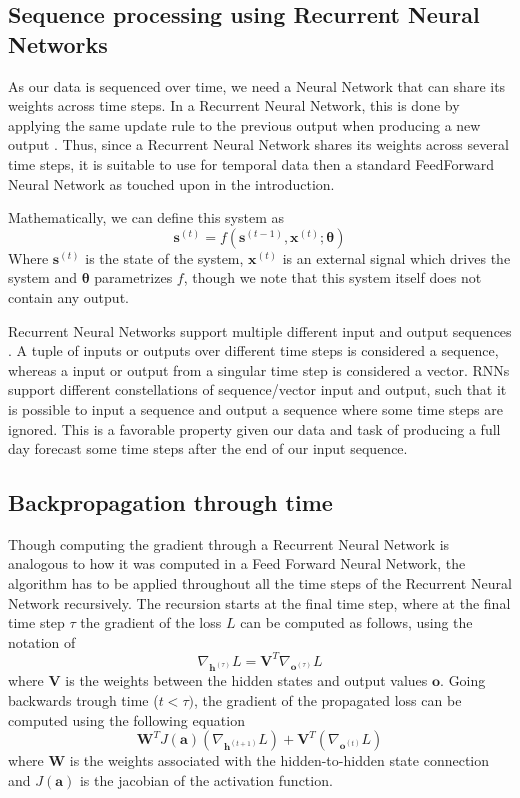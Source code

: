 \documentclass
[twocolumn,
secnumarabic,
nobibnotes,
aps,
prl,
reprint,
groupedaddress,
amsmath,
amssymb,
]{revtex4-2}
\begin{document}
\subsection{Sequence processing using Recurrent Neural Networks}
As our data is sequenced over time, we need a Neural Network that can share its weights across time steps. In a Recurrent Neural Network, this is done by applying the same update rule to the previous output when producing a new output \cite{Goodfellow2016}. Thus, since a Recurrent Neural Network shares its weights across several time steps, it is suitable to use for temporal data then a standard FeedForward Neural Network as touched upon in the introduction.

Mathematically, we can define this system as
\begin{equation}
  \nonumber
  \bm{s}^{(t)} = f(\bm{s}^{(t-1)},\bm{x}^{(t)};\bm{\theta})
\end{equation}
Where $\bm{s}^{(t)}$ is the state of the system, $\bm{x}^{(t)}$ is an external signal which drives the system and $\bm{\theta}$ parametrizes $f$, though we note that this system itself does not contain any output. 

Recurrent Neural Networks support multiple different input and output sequences \cite{Geron2019}. A tuple of inputs or outputs over different time steps is considered a sequence, whereas a input or output from a singular time step is considered a vector. RNNs support different constellations of sequence/vector input and output, such that it is possible to input a sequence and output a sequence where some time steps are ignored. This is a favorable property given our data and task of producing a full day forecast some time steps after the end of our input sequence.

\subsection{Backpropagation through time}
Though computing the gradient through a Recurrent Neural Network is analogous to how it was computed in a Feed Forward Neural Network, the algorithm has to be applied throughout all the time steps of the Recurrent Neural Network recursively. The recursion starts at the final time step, where at the final time step $\tau$ the gradient of the loss $L$ can be computed as follows, using the notation of \cite{Goodfellow2016}
\begin{equation}
  \nabla_{\bm{h}^{(\tau)}}L = \bm{V}^T \nabla_{\bm{o}^{(\tau)}}L
\end{equation}
where $\bm{V}$ is the weights between the hidden states and output values $\bm{o}$.
Going backwards trough time ($t < \tau)$, the gradient of the propagated loss can be computed using the following equation
\begin{equation}
  \bm{W}^TJ(\bm{a})(\nabla_{\bm{h}^{(t+1)}}L)+\bm{V}^T(\nabla_{\bm{o}^{(t)}}L)
\end{equation}
where $\bm{W}$ is the weights associated with the hidden-to-hidden state connection and $J(\bm{a})$ is the jacobian of the activation function.%
\end{document}
